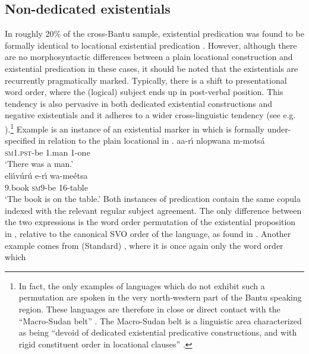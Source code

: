 \documentclass[output=paper]{langsci/langscibook}
\begin{document}
\subsection{Non-dedicated existentials}\label{sec:1:3.1}
In roughly 20\% of the cross-Bantu sample, existential predication was found to be formally identical to locational existential predication \citep{BernanderDevos2018}. However, although there are no morphosyntactic differences between a plain locational construction and existential predication in these cases, it should be noted that the existentials are recurrently pragmatically marked. Typically, there is a shift to presentational word order, where the (logical) subject ends up in post-verbal position. This tendency is also pervasive in both dedicated existential constructions and negative existentials and it adheres to a wider cross-linguistic tendency (see e.g. \citealt{Freeze1992,BentleyCiconte2013}).\footnote{In fact, the only examples of languages which do not exhibit such a permutation are spoken in the very north-western part of the Bantu speaking region. These languages are therefore in close or direct contact with the ``Macro-Sudan belt'' \citep{Guldemann2008}. The Macro-Sudan belt is a linguistic area characterized as being ``devoid of dedicated existential predicative constructions, and with rigid constituent order in locational clauses'' \citep[22]{Creissels2014}.} Example  is an instance of an existential marker in  which is formally under-specified in relation to the plain locational in .
\ea\label{ex:makhuwa-man-table}
\ea\label{ex:makhuwa-man}
\gll aa-r{\'\i} nlopwana  m-mots{\'a}\\
     \textsc{sm}1.\textsc{pst}-be 1.man 1-one\\
\glt `There was a man.'\\
\ex\label{ex:makhuwa-table}
\gll eli{\'\i}v{\'u}r{\'u} e-r{\'\i} wa-me{\'e}tsa\\
	9.book \textsc{sm}9-be 16-table\\
\glt `The book is on the table.'
\z\z
Both instances of predication contain the same copula indexed with the
relevant regular subject agreement. The only difference between the two
expressions is the word order permutation of the existential proposition in
, relative to the canonical SVO order of the language,
as found in . Another example comes from
(Standard)
, where it is once again only the word order which
\end{document}
